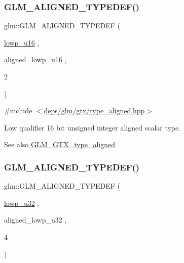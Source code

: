 \subsubsection{\texorpdfstring{G\+L\+M\+\_\+\+A\+L\+I\+G\+N\+E\+D\+\_\+\+T\+Y\+P\+E\+D\+E\+F()}{GLM\_ALIGNED\_TYPEDEF()}\hspace{0.1cm}{\footnotesize\ttfamily [78/209]}}
{\footnotesize\ttfamily glm\+::\+G\+L\+M\+\_\+\+A\+L\+I\+G\+N\+E\+D\+\_\+\+T\+Y\+P\+E\+D\+EF (\begin{DoxyParamCaption}\item[{\hyperlink{group__gtc__type__precision_ga22c5364f27caa0a6eb0627cbc21e46be}{lowp\+\_\+u16}}]{,  }\item[{aligned\+\_\+lowp\+\_\+u16}]{,  }\item[{2}]{ }\end{DoxyParamCaption})}



{\ttfamily \#include $<$\hyperlink{gtx_2type__aligned_8hpp}{deps/glm/gtx/type\+\_\+aligned.\+hpp}$>$}

Low qualifier 16 bit unsigned integer aligned scalar type. \begin{DoxySeeAlso}{See also}
\hyperlink{group__gtx__type__aligned}{G\+L\+M\+\_\+\+G\+T\+X\+\_\+type\+\_\+aligned} 
\end{DoxySeeAlso}
\mbox{\label{group__gtx__type__aligned_ga31ba41fd896257536958ec6080203d2a}} 
\subsubsection{\texorpdfstring{G\+L\+M\+\_\+\+A\+L\+I\+G\+N\+E\+D\+\_\+\+T\+Y\+P\+E\+D\+E\+F()}{GLM\_ALIGNED\_TYPEDEF()}\hspace{0.1cm}{\footnotesize\ttfamily [79/209]}}
{\footnotesize\ttfamily glm\+::\+G\+L\+M\+\_\+\+A\+L\+I\+G\+N\+E\+D\+\_\+\+T\+Y\+P\+E\+D\+EF (\begin{DoxyParamCaption}\item[{\hyperlink{group__gtc__type__precision_gaba06fae1dd98ca50c017e68345df0365}{lowp\+\_\+u32}}]{,  }\item[{aligned\+\_\+lowp\+\_\+u32}]{,  }\item[{4}]{ }\end{DoxyParamCaption})}



